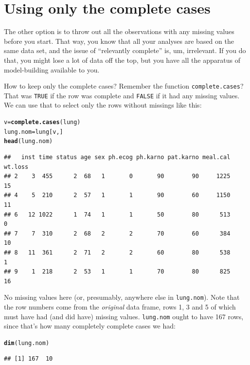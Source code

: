 \documentclass{article}\usepackage[]{graphicx}\usepackage[]{color}
\makeatletter
\newcommand{\hlstd}[1]{\textcolor[rgb]{0.345,0.345,0.345}{#1}}%
\newcommand{\hlkwb}[1]{\textcolor[rgb]{0.69,0.353,0.396}{#1}}%
\newcommand{\hlkwd}[1]{\textcolor[rgb]{0.737,0.353,0.396}{\textbf{#1}}}%
\newenvironment{kframe}{%
 \def\at@end@of@kframe{}%
 \ifinner\ifhmode%
  \def\at@end@of@kframe{\end{minipage}}%
  \begin{minipage}{\columnwidth}%
 \fi\fi%
 \def\FrameCommand##1{\hskip\@totalleftmargin \hskip-\fboxsep
 \colorbox{shadecolor}{##1}\hskip-\fboxsep
     \hskip-\linewidth \hskip-\@totalleftmargin \hskip\columnwidth}%
 \MakeFramed {\advance\hsize-\width
   \@totalleftmargin\z@ \linewidth\hsize
   \@setminipage}}%
 {\par\unskip\endMakeFramed%
 \at@end@of@kframe}
\newenvironment{knitrout}{}{} %
\makeatother
\begin{document}
\section{Using only the complete cases}

The other option is to throw out all the observations with any missing
values before you start. That way, you know that all your analyses are
based on the same data set, and the issue of ``relevantly complete''
is, um, irrelevant. If you do that, you might lose a lot of data off
the top, but you have all the apparatus of model-building available to you.

How to keep only the complete cases? Remember the function \texttt{complete.cases}?
That was \texttt{TRUE} if the row was complete and \texttt{FALSE} if
it had any missing values. We can use that to select only the rows
without missings like this:

\begin{knitrout}
\color{fgcolor}\begin{kframe}
\begin{alltt}
\hlstd{v}\hlkwb{=}\hlkwd{complete.cases}\hlstd{(lung)}
\hlstd{lung.nom}\hlkwb{=}\hlstd{lung[v,]}
\hlkwd{head}\hlstd{(lung.nom)}
\end{alltt}
\begin{verbatim}
##   inst time status age sex ph.ecog ph.karno pat.karno meal.cal wt.loss
## 2    3  455      2  68   1       0       90        90     1225      15
## 4    5  210      2  57   1       1       90        60     1150      11
## 6   12 1022      1  74   1       1       50        80      513       0
## 7    7  310      2  68   2       2       70        60      384      10
## 8   11  361      2  71   2       2       60        80      538       1
## 9    1  218      2  53   1       1       70        80      825      16
\end{verbatim}
\end{kframe}
\end{knitrout}

No missing values here (or, presumably, anywhere else in
\texttt{lung.nom}). Note that the row numbers come from the
\emph{original} data frame, rows 1, 3 and 5 of which must have had
(and did have) missing values. \texttt{lung.nom} ought to have 167
rows, since that's how many completely complete cases we had:

\begin{knitrout}
\color{fgcolor}\begin{kframe}
\begin{alltt}
\hlkwd{dim}\hlstd{(lung.nom)}
\end{alltt}
\begin{verbatim}
## [1] 167  10
\end{verbatim}
\end{kframe}
\end{knitrout}
\end{document}
